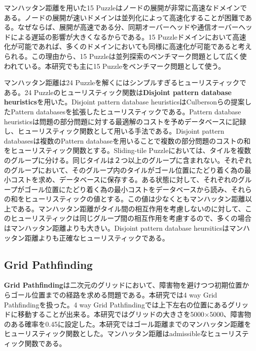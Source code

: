 \documentclass[uplatex]{jsarticle}
\begin{document}
マンハッタン距離を用いた15 Puzzleはノードの展開が非常に高速なドメインである。ノードの展開が速いドメインは並列化によって高速化することが困難である。なぜならば、展開が高速である分、同期オーバーヘッドや通信オーバーヘッドによる遅延の影響が大きくなるからである。15 Puzzleドメインにおいて高速化が可能であれば、多くのドメインにおいても同様に高速化が可能であると考えられる。この理由から、15 Puzzleは並列探索のベンチマーク問題として広く使われている。本研究でも主に15 Puzzleをベンチマーク問題として使う。

マンハッタン距離は24 Puzzleを解くにはシンプルすぎるヒューリスティックである。24 Puzzleのヒューリスティック関数は\textbf{Disjoint pattern database heuristics}を用いた\cite{Korf2002}。Disjoint pattern database heuristicsはCulbersonらの提案したPattern databasesを拡張したヒューリスティックである。Pattern database heuristicsは問題の部分問題に対する最適解のコストを予めデータベースに記録し、ヒューリスティック関数として用いる手法である\cite{Culberson1998pattern}。Disjoint pattern databasesは複数のPattern databaseを用いることで複数の部分問題のコストの和をヒューリスティック関数とする。Sliding-tile Puzzleにおいては、タイルを複数のグループに分ける。同じタイルは２つ以上のグループに含まれない。それぞれのグループにおいて、そのグループ内のタイルがゴール位置にたどり着く為の最小コストを求め、データベースに保存する。ある状態に対して、それぞれのグループがゴール位置にたどり着く為の最小コストをデータベースから読み、それらの和をヒューリスティックの値とする。この値は少なくともマンハッタン距離以上である。マンハッタン距離がタイル間の相互作用を考慮しないのに対して、このヒューリスティックは同じグループ間の相互作用を考慮するので、多くの場合はマンハッタン距離よりも大きい。Disjoint pattern database heursiticsはマンハッタン距離よりも正確なヒューリスティックである。


\subsection{Grid Pathfinding}

\textbf{Grid Pathfinding}は二次元のグリッドにおいて、障害物を避けつつ初期位置からゴール位置までの経路を求める問題である。本研究では4 way Grid Pathfindingを扱った。4 way Grid Pathfindingでは上下左右の位置にあるグリッドに移動することが出来る。本研究ではグリッドの大きさを5000$\times$5000、障害物のある確率を0.45に設定した。本研究ではゴール距離までのマンハッタン距離をヒューリスティック関数とした。マンハッタン距離はadmissibleなヒューリスティック関数である。
\end{document}
